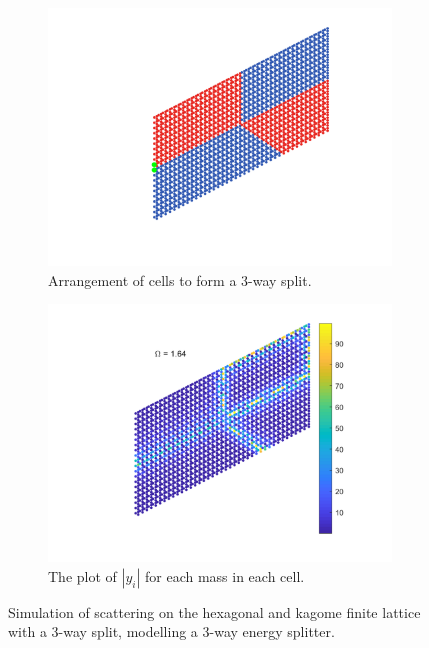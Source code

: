 \begin{figure}
\medskip
\centering
\begin{subfigure}[b]{.5\textwidth}
  \centering
  \includegraphics[width=0.8\linewidth]{imgs/kagomeesplitarr.png}
  \caption{Arrangement of cells to form a 3-way split.}
  \label{fig:sub1}
\end{subfigure}%
\begin{subfigure}[b]{.5\textwidth}
  \centering
  \includegraphics[width=1\linewidth]{imgs/kagomeesplitscat.png}
  \caption{The plot of $|y_i|$ for each mass in each cell.}
  \label{fig:sub2}
\end{subfigure}
\caption{Simulation of scattering on the hexagonal and kagome finite lattice
  with a 3-way split, modelling a 3-way energy splitter.}
\label{fig:esplit}
\end{figure}

